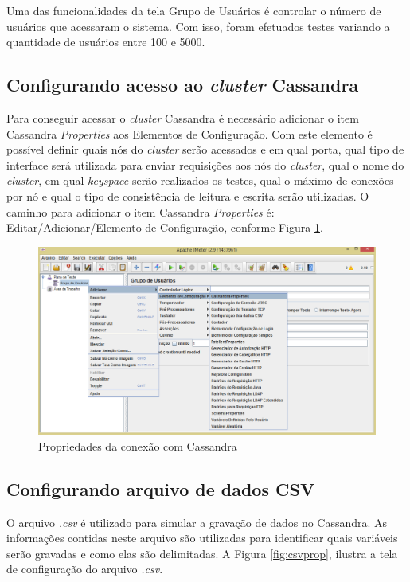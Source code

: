 Uma das funcionalidades da tela Grupo de Usuários é controlar o número de usuários que acessaram o sistema. Com isso, foram efetuados testes variando a quantidade de usuários entre 100 e 5000.

\subsection{Configurando acesso ao \textit{cluster} Cassandra}

Para conseguir acessar o \textit{cluster} Cassandra é necessário adicionar o item Cassandra \textit{Properties} aos Elementos de Configuração. Com este elemento é possível definir quais nós do \textit{cluster} serão acessados e em qual porta, qual tipo de interface será utilizada para enviar requisições aos nós do \textit{cluster}, qual o nome do \textit{cluster}, em qual \textit{keyspace} serão realizados os testes, qual o máximo de conexões por nó e qual o tipo de consistência de leitura e escrita serão utilizadas. O caminho para adicionar o item Cassandra \textit{Properties} é: Editar/Adicionar/Elemento de Configuração, conforme Figura \ref{fig:cassandraproperties}.


   \begin{figure}[htb]
    \centering
    \includegraphics[scale=0.5]{imagens/cassandraprop.png}
    \caption{Propriedades da conexão com Cassandra}
    \label{fig:cassandraproperties}
    \end{figure}


\subsection{Configurando arquivo de dados CSV}

O arquivo \textit{.csv} é utilizado para simular a gravação de dados no Cassandra. As informações contidas neste arquivo são utilizadas para identificar quais variáveis serão gravadas e como elas são delimitadas. A Figura \ref{fig:csvprop}, ilustra a tela de configuração do arquivo \textit{.csv}.

